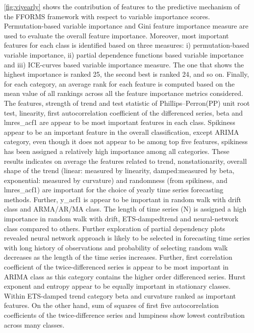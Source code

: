 \documentclass[11pt,a4paper,]{article}
\begin{document}
\autoref{fig:viyearly} shows the contribution of features to the
predictive mechanism of the FFORMS framework with respect to variable
importance scores. Permutation-based variable importance and Gini
feature importance measure are used to evaluate the overall feature
importance. Moreover, most important features for each class is
identified based on three measures: i) permutation-based variable
importance, ii) partial dependence functions based variable importance
and iii) ICE-curves based variable importance measure. The one that
shows the highest importance is ranked 25, the second best is ranked 24,
and so on. Finally, for each category, an average rank for each feature
is computed based on the mean value of all rankings across all the
feature importance metrics considered. The features, strength of trend
and test statistic of Phillips--Perron(PP) unit root test, linearity,
first autocorrelation coefficient of the differenced series, beta and
lmres\_acf1 are appear to be most important features in each class.
Spikiness appear to be an important feature in the overall
classification, except ARIMA category, even though it does not appear to
be among top five features, spikiness has been assigned a relatively
high importance among all categories. These results indicates on average
the features related to trend, nonstationarity, overall shape of the
trend (linear: measured by linearity, damped:measured by beta,
exponential: measured by curvature) and randomness (from spikiness, and
lmres\_acf1) are important for the choice of yearly time series
forecasting methods. Further, y\_acf1 is appear to be important in
random walk with drift class and ARMA/AR/MA class. The length of time
series (N) is assigned a high importance in random walk with drift,
ETS-dampedtrend and neural-network class compared to others. Further
exploration of partial dependency plots revealed neural network approach
is likely to be selected in forecasting time series with long history of
observations and probability of selecting random walk decreases as the
length of the time series increases. Further, first correlation
coefficient of the twice-differenced series is appear to be most
important in ARIMA class as this category contains the higher order
differenced series. Hurst exponent and entropy appear to be equally
important in stationary classes. Within ETS-damped trend category beta
and curvature ranked as important features. On the other hand, sum of
squares of first five autocorrelation coefficients of the
twice-difference series and lumpiness show lowest contribution across
many classes.
\end{document}
